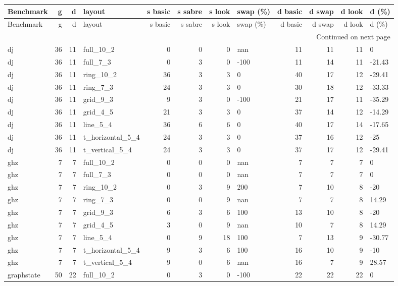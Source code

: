 \begin{longtable}{lrrlrrrlrrrl}
\toprule
Benchmark & g & d & layout & s basic & s sabre & s look & swap (\%) & d basic & d swap & d look & d (\%) \\
\midrule
\endfirsthead
\toprule
Benchmark & g & d & layout & s basic & s sabre & s look & swap (\%) & d basic & d swap & d look & d (\%) \\
\midrule
\endhead
\midrule
\multicolumn{12}{r}{Continued on next page} \\
\midrule
\endfoot
\bottomrule
\endlastfoot
dj & 36 & 11 & full\_10\_2 & 0 & 0 & 0 & nan & 11 & 11 & 11 & 0 \\
dj & 36 & 11 & full\_7\_3 & 0 & 3 & 0 & -100 & 11 & 14 & 11 & -21.43 \\
dj & 36 & 11 & ring\_10\_2 & 36 & 3 & 3 & 0 & 40 & 17 & 12 & -29.41 \\
dj & 36 & 11 & ring\_7\_3 & 24 & 3 & 3 & 0 & 30 & 18 & 12 & -33.33 \\
dj & 36 & 11 & grid\_9\_3 & 9 & 3 & 0 & -100 & 21 & 17 & 11 & -35.29 \\
dj & 36 & 11 & grid\_4\_5 & 21 & 3 & 3 & 0 & 37 & 14 & 12 & -14.29 \\
dj & 36 & 11 & line\_5\_4 & 36 & 6 & 6 & 0 & 40 & 17 & 14 & -17.65 \\
dj & 36 & 11 & t\_horizontal\_5\_4 & 24 & 3 & 3 & 0 & 37 & 16 & 12 & -25 \\
dj & 36 & 11 & t\_vertical\_5\_4 & 24 & 3 & 3 & 0 & 37 & 17 & 12 & -29.41 \\
ghz & 7 & 7 & full\_10\_2 & 0 & 0 & 0 & nan & 7 & 7 & 7 & 0 \\
ghz & 7 & 7 & full\_7\_3 & 0 & 0 & 0 & nan & 7 & 7 & 7 & 0 \\
ghz & 7 & 7 & ring\_10\_2 & 0 & 3 & 9 & 200 & 7 & 10 & 8 & -20 \\
ghz & 7 & 7 & ring\_7\_3 & 0 & 0 & 9 & nan & 7 & 7 & 8 & 14.29 \\
ghz & 7 & 7 & grid\_9\_3 & 6 & 3 & 6 & 100 & 13 & 10 & 8 & -20 \\
ghz & 7 & 7 & grid\_4\_5 & 3 & 0 & 9 & nan & 10 & 7 & 8 & 14.29 \\
ghz & 7 & 7 & line\_5\_4 & 0 & 9 & 18 & 100 & 7 & 13 & 9 & -30.77 \\
ghz & 7 & 7 & t\_horizontal\_5\_4 & 9 & 3 & 6 & 100 & 16 & 10 & 9 & -10 \\
ghz & 7 & 7 & t\_vertical\_5\_4 & 9 & 0 & 6 & nan & 16 & 7 & 9 & 28.57 \\
graphstate & 50 & 22 & full\_10\_2 & 0 & 3 & 0 & -100 & 22 & 22 & 22 & 0 \\

\end{longtable}
